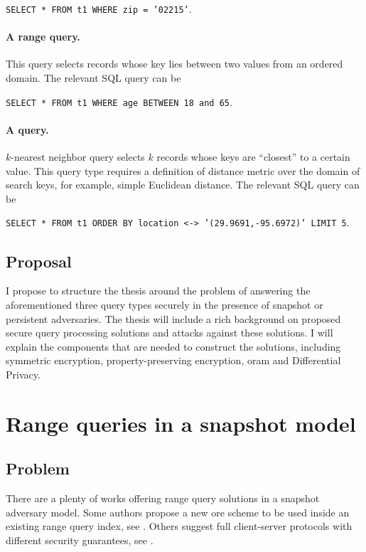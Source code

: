 					\texttt{SELECT * FROM t1 WHERE zip = '02215'}.

				\paragraph*{A range query.}
					This query selects records whose key lies between two values from an ordered domain.
					The relevant SQL query can be

					\texttt{SELECT * FROM t1 WHERE age BETWEEN 18 and 65}.

				\paragraph*{A \knn{} query.}
					$k$-nearest neighbor query selects $k$ records whose keys are ``closest'' to a certain value.
					This query type requires a definition of distance metric over the domain of search keys, for example, simple Euclidean distance.
					The relevant SQL query can be

					\texttt{SELECT * FROM t1 ORDER BY location <-> '(29.9691,-95.6972)' LIMIT 5}. %

		\subsection{Proposal}

			I propose to structure the thesis around the problem of answering the aforementioned three query types securely in the presence of snapshot or persistent adversaries.
			The thesis will include a rich background on proposed secure query processing solutions and attacks against these solutions.
			I will explain the components that are needed to construct the solutions, including symmetric encryption, property-preserving encryption, \acrlong{oram} and Differential Privacy.

	\section{Range queries in a snapshot model}

		\subsection{Problem}

			There are a plenty of works offering range query solutions in a snapshot adversary model.
			Some authors propose a new \acrfull{ore} scheme to be used inside an existing range query index, see \cite{bclo-ope,clww-ore,lewi-wu-ore,cloz-ore,fh-ope}.
			Others suggest full client-server protocols with different security guarantees, see \cite{florian-protocol,pope,practical-ore}.

